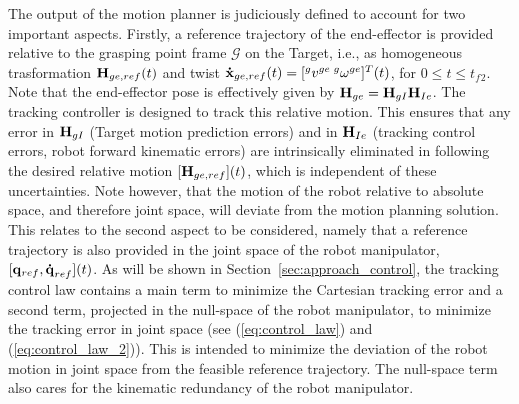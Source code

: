 The output of the motion planner is judiciously defined to account for two important aspects. Firstly, a reference trajectory of the end-effector is provided relative to the grasping point frame $\mathcal{G}$ on the Target, i.e., as homogeneous trasformation $\boldsymbol {\mathrm{H}}{}_{ge, ref}(t)$ and twist $\boldsymbol {\mathrm{\dot{x}}}{}_{ge, ref}(t)=[{}^{g}v^{ge} \: {}^{g}\omega^{ge}]{}^T(t)$, for $0 \le t \le t_f{}_2$. Note that the end-effector pose is effectively given by $\boldsymbol {\mathrm{H}}{}_{ge}=\boldsymbol {\mathrm{H}}{}_{gI}\boldsymbol {\mathrm{H}}{}_{Ie}$. The tracking controller is designed to track this relative motion. This ensures that any error in $\boldsymbol {\mathrm{H}}{}_{gI}$ (Target motion prediction errors) and in $\boldsymbol {\mathrm{H}}{}_{Ie}$ (tracking control errors, robot forward kinematic errors) are intrinsically eliminated in following the desired relative motion $[\boldsymbol {\mathrm{H}}{}_{ge, ref}](t)$, which is independent of these uncertainties. Note however, that the motion of the robot relative to absolute space, and therefore joint space, will deviate from the motion planning solution. This relates to the second aspect to be considered, namely that a reference trajectory is also provided in the joint space of the robot manipulator, $[\boldsymbol {\mathrm{q}}{}_{ref}, \boldsymbol {\mathrm{\dot{q}}}_{ref}](t)$. As will be shown in Section~\ref{sec:approach_control}, the tracking control law contains a main term to minimize the Cartesian tracking error and a second term, projected in the null-space of the robot manipulator, to minimize the tracking error in joint space (see (\ref{eq:control_law}) and (\ref{eq:control_law_2})). This is intended to minimize the deviation of the robot motion in joint space from the feasible reference trajectory. The null-space term also cares for the kinematic redundancy of the robot manipulator. 

%
